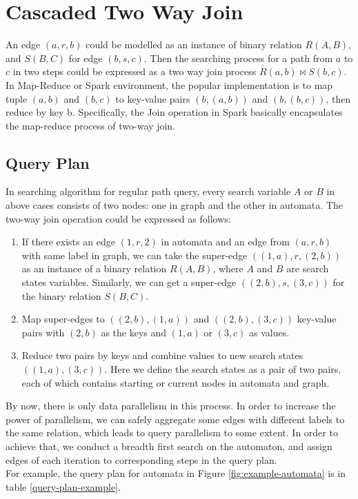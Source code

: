 \chapter{\label{cha:two-way}Cascaded Two Way Join}
An edge $(a,r,b)$ could be modelled as an instance of binary relation $R(A,B)$, and $S(B,C)$ for edge $(b,s,c)$. Then the searching process for a path from $a$ to $c$ in two steps could be expressed as a two way join process $R(a,b) \bowtie S(b,c)$. In Map-Reduce or Spark environment, the popular implementation is to map tuple $(a,b)$ and $(b,c)$ to key-value pairs $(b,(a,b))$ and $(b,(b,c))$, then reduce by key b. Specifically, the Join operation in Spark basically encapsulates the map-reduce process of two-way join.
\section{Query Plan}
In searching algorithm for regular path query, every search variable $A$ or $B$ in above cases consists of two nodes: one in graph and the other in automata. The two-way join operation could be expressed as follows:
\begin{enumerate}
    \item If there exists an edge $(1,r,2)$ in automata and an edge from $(a,r,b)$ with same label in graph, we can take the super-edge $((1,a),r,(2,b))$ as an instance of a binary relation $R(A,B)$, where $A$ and $B$ are search states variables. Similarly, we can get a super-edge $((2,b),s,(3,c))$ for the binary relation $S(B,C)$.
    \item Map super-edges to $((2,b),(1,a))$ and $((2,b),(3,c))$ key-value pairs with $(2,b)$ as the keys and $(1,a)$ or $(3,c)$ as values.
    \item Reduce two pairs by keys and combine values to new search states $((1,a),(3,c))$. Here we define the search states as a pair of two pairs, each of which contains  starting or current nodes in automata and graph.
\end{enumerate}
By now, there is only data parallelism in this process. In order to increase the power of parallelism, we can safely aggregate some edges with different labels to the same relation, which leads to query parallelism to some extent. In order to achieve that, we conduct a breadth first search on the automaton, and assign edges of each iteration to corresponding steps in the query plan.\\
For example, the query plan for automata in Figure \ref{fig:example-automata} is in table \ref{query-plan-example}.
